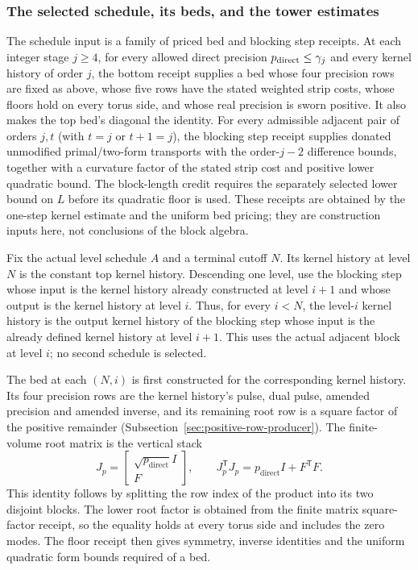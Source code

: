 \subsubsection{The selected schedule, its beds, and the tower estimates}
\label{subsec:ex-lattice-horizon-producer}

The schedule input is a family of priced bed and blocking step receipts. At each
integer stage $j\geq4$, for every allowed direct precision $p_{\rm direct}
\leq\gamma_j$ and every kernel history of order $j$, the bottom receipt supplies a
bed whose four precision rows are fixed as above, whose five rows have the
stated weighted strip costs, whose floors hold on every torus side, and
whose real precision is sworn positive. It also makes the top bed's
diagonal the identity. For every admissible adjacent pair of orders
$j,t$ (with $t=j$ or $t+1=j$), the blocking step receipt supplies donated
unmodified primal/two-form transports with the order-$j-2$ difference
bounds, together with a curvature factor of the stated strip cost and
positive lower quadratic bound. The block-length credit requires the
separately selected lower bound on $L$ before its quadratic floor is used.
These receipts are obtained by the one-step kernel estimate and the uniform bed
pricing; they are construction inputs here, not conclusions of the block
algebra.

Fix the actual level schedule $A$ and a terminal cutoff $N$. Its kernel history at
level $N$ is the constant top kernel history. Descending one level, use the blocking step
whose input is the kernel history already constructed at level $i+1$ and whose output
is the kernel history at level $i$. Thus, for every $i<N$, the level-$i$ kernel history is the output kernel history of the
blocking step whose input is the already defined kernel history at level $i+1$. This uses
the actual adjacent block at level $i$; no second schedule is selected.

The bed at each $(N,i)$ is first constructed for the corresponding kernel history.
Its four precision rows are the kernel history's
pulse, dual pulse, amended precision and amended inverse, and its
remaining root row is a square factor of the positive remainder
(Subsection~\ref{sec:positive-row-producer}). The
finite-volume root matrix is the vertical stack
\[
 J_p=\begin{bmatrix}\sqrt{p_{\mathrm{direct}}}I\\F\end{bmatrix},
 \qquad J_p^{\mathsf T}J_p
   =p_{\mathrm{direct}}I+F^{\mathsf T}F.
\]
This identity follows by splitting the row index of the product into its
two disjoint blocks. The lower root factor is obtained from the finite
matrix square-factor receipt, so the equality holds at every torus side
and includes the zero modes. The floor receipt then gives symmetry,
inverse identities and the uniform quadratic form bounds required of a
bed.

